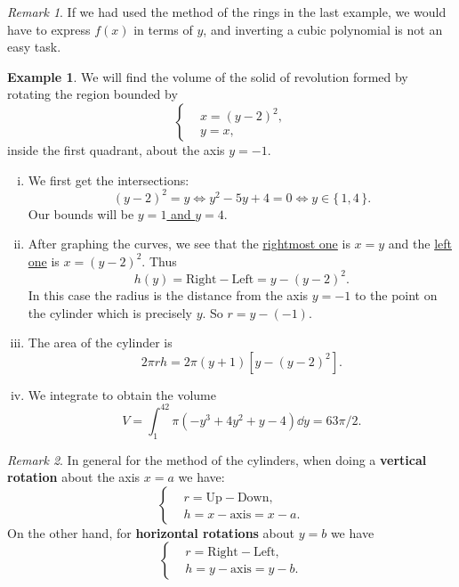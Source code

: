 \documentclass[12pt]{article}
\theoremstyle{plain}
\theoremstyle{definition}
\newtheorem{Ex}[Th]{Example}           %
\theoremstyle{remark}
\newtheorem*{Rmk}{Remark}      %
\renewcommand{\:}{\colon}           %
\newcommand{\un}[1]{\underline{#1}}
\renewcommand{\.}{\Cdot}                %
\newcommand{\set}[1]{\{\,#1\,\}}    %
\begin{document}
\begin{multicols}{2}
\begin{Rmk}
  If we had used the method of the rings in the last example, we would have to express $f(x)$ in terms of $y$, and inverting a cubic polynomial is not an easy task.
\end{Rmk}

\begin{Ex}
  We will find the volume of the solid of revolution formed by rotating the region bounded by 
  $$
  \left\lbrace
  \begin{aligned}
    &x=(y-2)^2,\\
    &y=x,
  \end{aligned}
  \right.
  $$
  inside the first quadrant, about the axis $y=-1$. 
  \begin{enumerate}[i)]
    \itemsep=-0.4em
    \item We first get the intersections:
    $$(y-2)^2=y\iff y^2-5y+4=0\iff y\in\set{1,4}.$$
    Our bounds will be \un{$y=1$ and $y=4$}.
    \item After graphing the curves, we see that the \un{rightmost one} is $x=y$ and the \un{left one} is $x=(y-2)^2$. Thus 
    $$h(y)=\text{Right}-\text{Left}=y-(y-2)^2.$$
    In this case the radius is the distance from the axis $y=-1$ to the point on the cylinder which is precisely $y$. So \un{$r=y-(-1)$}. 
    \item The area of the cylinder is 
    $$2\pi rh=2\pi(y+1)[y-(y-2)^2].$$
    \item We integrate to obtain the volume 
    $$V=\int_1^42\pi(-y^3+4y^2+y-4)\dd y=63\pi/2.$$
  \end{enumerate}
\end{Ex}

\begin{ptcb}
  \begin{Rmk}
 In general for the method of the cylinders, when doing a \textbf{vertical rotation} about the axis $x=a$ we have:
 $$
 \left\lbrace
 \begin{aligned}
  &r=\text{Up}-\text{Down},\\
  &h=x-\text{axis}=x-a.
 \end{aligned}
 \right.
  $$
  On the other hand, for \textbf{horizontal rotations} about $y=b$ we have
  $$
  \left\lbrace
  \begin{aligned}
   &r=\text{Right}-\text{Left},\\
   &h=y-\text{axis}=y-b.
  \end{aligned}
  \right.
   $$ 
  
  \end{Rmk}
  \end{ptcb}


\end{multicols}
\end{document}
